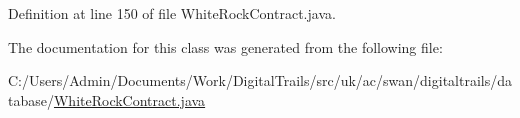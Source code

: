 Definition at line 150 of file White\+Rock\+Contract.\+java.



The documentation for this class was generated from the following file\+:\begin{DoxyCompactItemize}
\item 
C\+:/\+Users/\+Admin/\+Documents/\+Work/\+Digital\+Trails/src/uk/ac/swan/digitaltrails/database/\hyperlink{_white_rock_contract_8java}{White\+Rock\+Contract.\+java}\end{DoxyCompactItemize}
